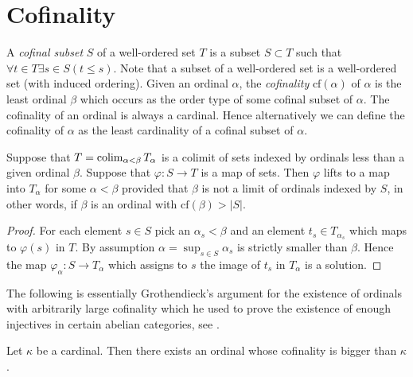 \section{Cofinality}
\label{section-cofinality}

\noindent
A {\it cofinal subset} $S$ of a well-ordered set $T$ is a subset
$S \subset T$ such that $\forall t \in T \exists s\in S (t \leq s)$.
Note that a subset of a well-ordered set is a well-ordered set
(with induced ordering). Given an ordinal $\alpha$, the {\it cofinality}
$\text{cf}(\alpha)$ of $\alpha$ is the least ordinal $\beta$
which occurs as the order type of some cofinal subset of $\alpha$.
The cofinality of an ordinal is always a cardinal.
Hence alternatively we can define the cofinality of
$\alpha$ as the least cardinality of a cofinal subset of $\alpha$.

\begin{lemma}
\label{lemma-map-from-set-lifts}
Suppose that $T = \mathop{\mathrm{colim}}\nolimits_{\alpha < \beta} T_\alpha$
is a colimit of sets indexed by ordinals less than a given ordinal $\beta$.
Suppose that $\varphi : S \to T$ is a map of sets.
Then $\varphi$ lifts to a map into $T_\alpha$ for some $\alpha < \beta$
provided that $\beta$ is not a limit of ordinals indexed by $S$,
in other words, if $\beta$ is an ordinal with $\text{cf}(\beta) > |S|$.
\end{lemma}

\begin{proof}
For each element $s \in S$ pick an $\alpha_s < \beta$ and an element
$t_s \in T_{\alpha_s}$ which maps to $\varphi(s)$ in $T$.
By assumption $\alpha = \sup_{s \in S} \alpha_s$ is strictly smaller
than $\beta$. Hence the map $\varphi_\alpha : S \to T_\alpha$
which assigns to $s$ the image of $t_s$ in $T_\alpha$ is a solution.
\end{proof}

\noindent
The following is essentially Grothendieck's argument for the existence
of ordinals with arbitrarily large cofinality which he used to prove
the existence of enough injectives in certain abelian categories, see
\cite{Tohoku}.

\begin{proposition}
\label{proposition-exist-ordinals-large-cofinality}
Let $\kappa$ be a cardinal. Then there exists an ordinal
whose cofinality is bigger than $\kappa$.
\end{proposition}

